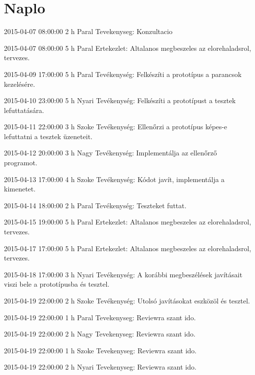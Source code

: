 \section{Naplo}
\begin{naplo}

            {2015-04-07 08:00:00}
            {2 h}
            {Paral\newlineNyari\newlineNagy\newlineSzoke}
            {Tevekenyseg: Konzultacio}

            {2015-04-07 08:00:00}
            {5 h}
            {Paral\newlineNyari\newlineNagy\newlineSzoke}
            {Ertekezlet: Altalanos megbeszeles az elorehaladsrol, tervezes.}

            {2015-04-09 17:00:00}
            {5 h}
            {Paral}
            {Tevékenység: Felkészíti a prototípus a parancsok kezelésére.}

            {2015-04-10 23:00:00}
            {5 h}
            {Nyari}
            {Tevékenység: Felkészíti a prototípust a tesztek lefuttatására.}

            {2015-04-11 22:00:00}
            {3 h}
            {Szoke}
            {Tevékenység: Ellenőrzi a prototípus képes-e lefuttatni a tesztek üzeneteit.}

            {2015-04-12 20:00:00}
            {3 h}
            {Nagy}
            {Tevékenység: Implementálja az ellenőrző programot.}

            {2015-04-13 17:00:00}
            {4 h}
            {Szoke}
            {Tevékenység: Kódot javít, implementálja a kimenetet.}

            {2015-04-14 18:00:00}
            {2 h}
            {Paral}
            {Tevékenység: Teszteket futtat.}

            {2015-04-15 19:00:00}
            {5 h}
            {Paral\newlineNyari\newlineNagy\newlineSzoke}
            {Ertekezlet: Altalanos megbeszeles az elorehaladsrol, tervezes.}

            {2015-04-17 17:00:00}
            {5 h}
            {Paral\newlineNyari\newlineNagy\newlineSzoke}
            {Ertekezlet: Altalanos megbeszeles az elorehaladsrol, tervezes.}

            {2015-04-18 17:00:00}
            {3 h}
            {Nyari}
            {Tevékenység: A korábbi megbeszélések javításait viszi bele a prototípusba és tesztel.}

            {2015-04-19 22:00:00}
            {2 h}
            {Szoke}
            {Tevékenység: Utolsó javításokat eszközöl és tesztel.}

            {2015-04-19 22:00:00}
            {1 h}
            {Paral}
            {Tevekenyseg: Reviewra szant ido.}

            {2015-04-19 22:00:00}
            {2 h}
            {Nagy}
            {Tevekenyseg: Reviewra szant ido.}

            {2015-04-19 22:00:00}
            {1 h}
            {Szoke}
            {Tevekenyseg: Reviewra szant ido.}

            {2015-04-19 22:00:00}
            {2 h}
            {Nyari}
            {Tevekenyseg: Reviewra szant ido.}
\end{naplo}
